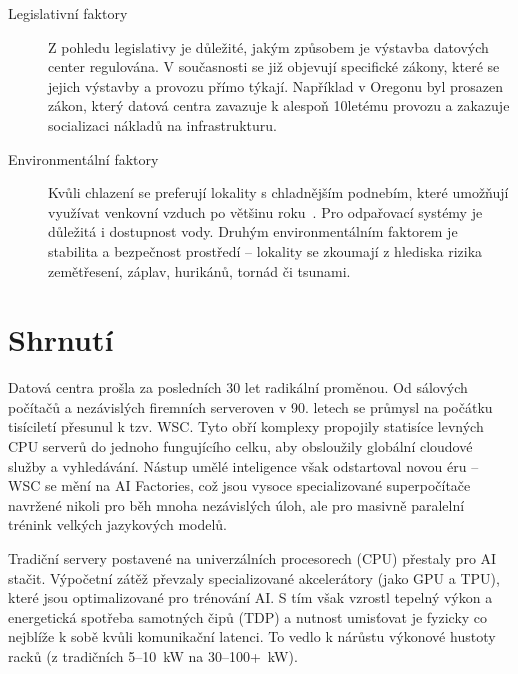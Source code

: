 \begin{description}
    \item[Legislativní faktory]
    Z pohledu legislativy je důležité, jakým způsobem je výstavba datových center regulována. V současnosti se již objevují specifické zákony, které se jejich výstavby a provozu přímo týkají. Například v Oregonu byl prosazen zákon, který datová centra zavazuje k alespoň 10letému provozu a zakazuje socializaci nákladů na infrastrukturu.~\cite[s.~19]{ginzburg-ganz_technical_2025}

    \item[Environmentální faktory] Kvůli chlazení se preferují lokality s chladnějším podnebím, které umožňují využívat venkovní vzduch po většinu roku~\cite{barroso_data_2026, geng_data_2014}. Pro odpařovací systémy je důležitá i dostupnost vody. Druhým environmentálním faktorem je stabilita a bezpečnost prostředí -- lokality se zkoumají z hlediska rizika zemětřesení, záplav, hurikánů, tornád či tsunami.~\cite{tatnall_reflections_2012,geng_data_2014}
\end{description}

\newpage

\section{Shrnutí}
\label{sec:shrnuti}


Datová centra prošla za posledních 30 let radikální proměnou. Od sálových počítačů a nezávislých firemních serveroven v 90. letech se průmysl na počátku tisíciletí přesunul k tzv. WSC. Tyto obří komplexy propojily statisíce levných CPU serverů do jednoho fungujícího celku, aby obsloužily globální cloudové služby a vyhledávání. Nástup umělé inteligence však odstartoval novou éru -- WSC se mění na AI Factories, což jsou vysoce specializované superpočítače navržené nikoli pro běh mnoha nezávislých úloh, ale pro masivně paralelní trénink velkých jazykových modelů.~\cite{barroso_data_2026,barroso_brief_2021,geng_data_2014}

Tradiční servery postavené na univerzálních procesorech (CPU) přestaly pro AI stačit. Výpočetní zátěž převzaly specializované akcelerátory (jako GPU a TPU), které jsou optimalizované pro trénování AI. S tím však vzrostl tepelný výkon a energetická spotřeba samotných čipů (TDP) a nutnost umisťovat je fyzicky co nejblíže k sobě kvůli komunikační latenci. To vedlo k nárůstu výkonové hustoty racků (z tradičních 5--10~kW na 30--100+~kW).~\cite{barroso_data_2026, sheng_power_2026,chen_electricity_2025}

